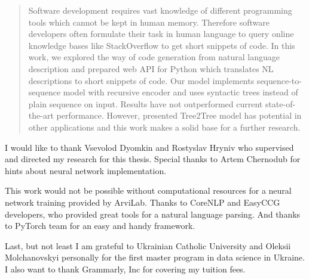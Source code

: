 \documentclass[
12pt, %
oneside, %
english, %
onehalfspacing, %
nolistspacing, %
liststotoc, %
parskip, %
headsepline, %
]{MastersDoctoralThesis} %
\begin{document}
\cleardoublepage

\begin{abstract}
\addchaptertocentry{\abstractname} 
Software development requires vast knowledge of different programming tools which cannot be kept in human memory. Therefore software developers often formulate their task in human language to query online knowledge bases like StackOverflow to get short snippets of code. In this work, we explored the way of code generation from natural language description and prepared web API for Python which translates NL descriptions to short snippets of code. Our model implements sequence-to-sequence model with recursive encoder and uses syntactic trees instead of plain sequence on input. Results have not outperformed current state-of-the-art performance. However, presented Tree2Tree model has potential in other applications and this work makes a solid base for a further research.
\end{abstract}


\begin{acknowledgements}
\addchaptertocentry{\acknowledgementname} %
I would like to thank Vsevolod Dyomkin and Rostyslav Hryniv who supervised and directed my research for this thesis. Special thanks to Artem Chernodub for hints about neural network implementation.

This work would not be possible without computational resources for a neural network training provided by ArviLab. Thanks to CoreNLP and EasyCCG developers, who provided great tools for a natural language parsing. And thanks to PyTorch team for an easy and handy framework.

Last, but not least I am grateful to Ukrainian Catholic University and Oleksii Molchanovskyi personally for the first master program in data science in Ukraine. I also want to thank Grammarly, Inc for covering my tuition fees.
\end{acknowledgements}


\tableofcontents %
\end{document}

